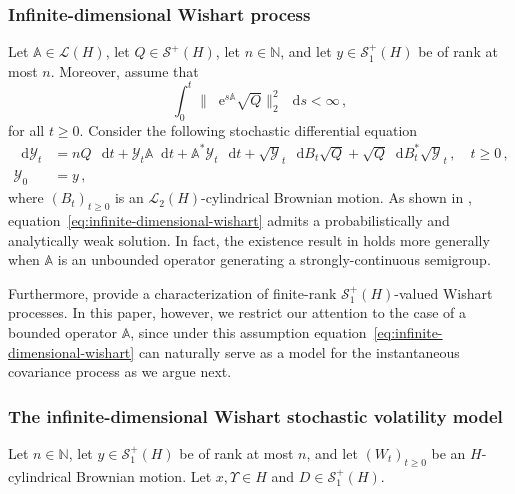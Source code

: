 \documentclass[10pt,a4paper,reqno]{amsart}
\newcommand*\D{\mathop{}\!\mathrm{d}}
\newcommand*\E{\mathop{}\!\mathrm{e}}
\numberwithin{equation}{section}
\theoremstyle{plain}
\theoremstyle{definition}
\theoremstyle{example}
\newcommand{\cL}{\mathcal{L}}
\newcommand{\cY}{\mathcal{Y}}
\newcommand{\cS}{\mathcal{S}}
\begin{document}
\subsubsection{Infinite-dimensional Wishart process}
Let $\mathbb{A} \in \cL(H)$, let $Q \in \cS^+(H)$, let $n \in \mathbb{N}$, and let $y \in \cS_1^+(H)$ be of rank at most $n$. Moreover, assume that  
$$\int_0^t \|\E^{s\mathbb{A}}\sqrt{Q}\|^2_{2} \, \D s< \infty\,,$$
for all $t\geq 0$. Consider the following stochastic differential equation 
\begin{align}\label{eq:infinite-dimensional-wishart}
\D \cY_t &= n Q\, \D t+ \cY_t \mathbb{A} \D t + \mathbb{A}^* \cY_t\, \D t +\sqrt{\cY}_t\, \D B_t\sqrt{Q} + \sqrt{Q} \D B_t^*\sqrt{\cY}_t\,, \quad t\geq 0\,,\nonumber\\
\cY_0 &= y\,,
\end{align}
where $(B_t)_{t\geq0}$ is an $\cL_2(H)$-cylindrical Brownian motion.
As shown in \cite[Theorem 2.1]{cox2024infinite}, equation~\eqref{eq:infinite-dimensional-wishart} admits a probabilistically and analytically weak solution. In fact, the existence result in \cite[Theorem 2.1]{cox2024infinite} holds more generally when $\mathbb{A}$ is an unbounded operator generating a strongly-continuous semigroup.

Furthermore, \cite[Proposition 4.7 and Corollary 4.11]{cox2024infinite} provide a characterization of finite-rank $\cS_1^+(H)$-valued Wishart processes. In this paper, however, we restrict our attention to the case of a bounded operator $\mathbb{A}$, since under this assumption equation~\eqref{eq:infinite-dimensional-wishart} can naturally serve as a model for the instantaneous covariance process as we argue next.

\subsubsection{The infinite-dimensional Wishart stochastic volatility model}

Let $n \in \mathbb{N}$, let $y \in \cS_1^+(H)$ be of rank at most $n$, and let $(W_t)_{t \geq 0}$ be an $H$-cylindrical Brownian motion.  
Let $x, \Upsilon \in H$ and $D \in \cS_1^+(H)$.
\end{document}

